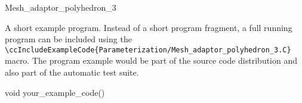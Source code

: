 \begin{ccRefClass}{Mesh_adaptor_polyhedron_3}
\ccExample

A short example program.
Instead of a short program fragment, a full running program can be
included using the 
\verb|\ccIncludeExampleCode{Parameterization/Mesh_adaptor_polyhedron_3.C}| 
macro. The program example would be part of the source code distribution and
also part of the automatic test suite.

\begin{ccExampleCode}
void your_example_code() {
}
\end{ccExampleCode}


\end{ccRefClass}


